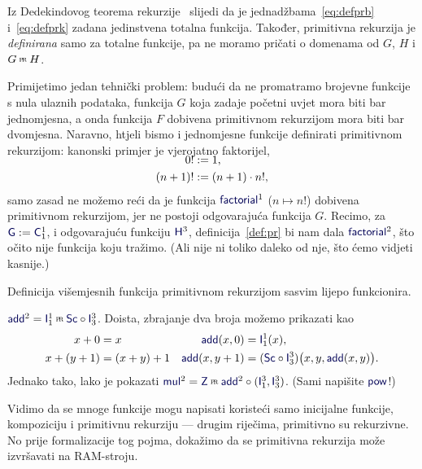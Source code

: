 \begin{napomena}\label{nap:prtot}
Iz Dedekindovog teorema rekurzije~\cite{skr:VukTS} slijedi da je jednadžbama~\eqref{eq:defprb} i~\eqref{eq:defprk} zadana jedinstvena totalna funkcija. Također, primitivna rekurzija je \emph{definirana} samo za totalne funkcije, pa ne moramo pričati o domenama od $G$, $H$ i $G\pr H$.
\end{napomena}

Primijetimo jedan tehnički problem: budući da ne promatramo brojevne funkcije s nula ulaznih podataka, funkcija $G$ koja zadaje početni uvjet mora biti bar jednomjesna, a onda funkcija $F$ dobivena primitivnom rekurzijom mora biti bar dvomjesna. Naravno, htjeli bismo i jednomjesne funkcije definirati primitivnom rekurzijom: kanonski primjer je vjerojatno faktorijel,
\begin{align}
\SwapAboveDisplaySkip
\label{eq:faktb}
    0!&:=1\text,\\
\label{eq:faktk}
    (n+1)!&:=(n+1)\cdot n!\text,
\end{align}
samo zasad ne možemo reći da je funkcija $\f{factorial}^1$ ($n\mapsto n!$) dobivena primitivnom rekurzijom, jer ne postoji odgovarajuća funkcija $G$. Recimo, za $\f G:=\f C_1^1$, i odgovarajuću funkciju $\f H^3$, definicija~\ref{def:pr} bi nam dala $\f{factorial}^2$, što očito nije funkcija koju tražimo. (Ali nije ni toliko daleko od nje, što ćemo vidjeti kasnije.)

Definicija višemjesnih funkcija primitivnom rekurzijom sasvim lijepo funkcionira.

\begin{primjer}\label{pr:addmulpow}
$\f{add}^2=\f I_1^1\pr\f{Sc}\circ\f I_3^3$. Doista, zbrajanje dva broja možemo prikazati kao
\begin{align}
\label{eq:addb}
    x+0&=x & \f{add}(x,0)&=\f I_1^1(x),\\
\label{eq:addk}
    x+(y+1)&=(x+y)+1 &\f{add}(x,y+1)&=(\f{Sc}\circ\f I_3^3)\bigl(x,y,\f{add}(x,y)\bigr).
\end{align}
Jednako tako, lako je pokazati $\f{mul}^2=\f Z\pr\f{add}^2\circ(\f I_1^3,\f I_3^3)$. (Sami napišite $\f{pow}$!)
\end{primjer}

Vidimo da se mnoge funkcije mogu napisati koristeći samo inicijalne funkcije, kompoziciju i primitivnu rekurziju --- drugim riječima, primitivno su rekurzivne. No prije formalizacije tog pojma, dokažimo da se primitivna rekurzija može izvršavati na RAM-stroju.


